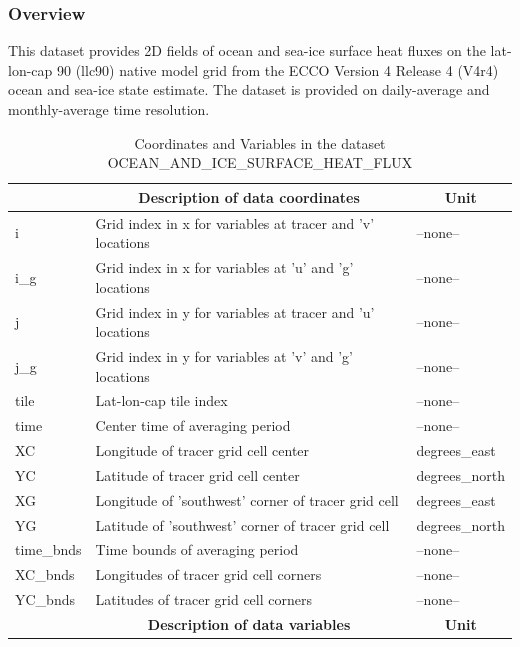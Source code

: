 \subsubsection{Overview}
This dataset provides 2D fields of ocean and sea-ice surface heat fluxes on the lat-lon-cap 90 (llc90) native model grid from the ECCO Version 4 Release 4 (V4r4) ocean and sea-ice state estimate. The dataset is provided on daily-average and monthly-average time resolution. 
\begin{longtable}{|m{}|m{}|m{}|}
\caption{Coordinates and Variables in the dataset OCEAN\_AND\_ICE\_SURFACE\_HEAT\_FLUX}
\label{tab:table-OCEAN_AND_ICE_SURFACE_HEAT_FLUX-fields} \\ 
\hline \endhead \hline \endfoot
\rowcolor{lightgray} \multicolumn{1}{|c|}{\textbf{Coordinates}} & \multicolumn{1}{|c|}{\textbf{Description of data coordinates}} &  \multicolumn{1}{|c|}{\textbf{Unit}}\\ \hline
i &Grid index in x for variables at tracer and 'v' locations &--none--  \\ \hline
i\_g &Grid index in x for variables at 'u' and 'g' locations &--none--  \\ \hline
j &Grid index in y for variables at tracer and 'u' locations &--none--  \\ \hline
j\_g &Grid index in y for variables at 'v' and 'g' locations &--none--  \\ \hline
tile &Lat-lon-cap tile index &--none--  \\ \hline
time &Center time of averaging period &--none--  \\ \hline
XC &Longitude of tracer grid cell center &degrees\_east  \\ \hline
YC &Latitude of tracer grid cell center &degrees\_north  \\ \hline
XG &Longitude of 'southwest' corner of tracer grid cell &degrees\_east  \\ \hline
YG &Latitude of 'southwest' corner of tracer grid cell &degrees\_north  \\ \hline
time\_bnds &Time bounds of averaging period &--none--  \\ \hline
XC\_bnds &Longitudes of tracer grid cell corners &--none--  \\ \hline
YC\_bnds &Latitudes of tracer grid cell corners &--none--  \\ \hline
\rowcolor{lightgray} \multicolumn{1}{|c|}{\textbf{Variables}} & \multicolumn{1}{|c|}{\textbf{Description of data variables}} &  \multicolumn{1}{|c|}{\textbf{Unit}}\\ \hline

\end{longtable}
